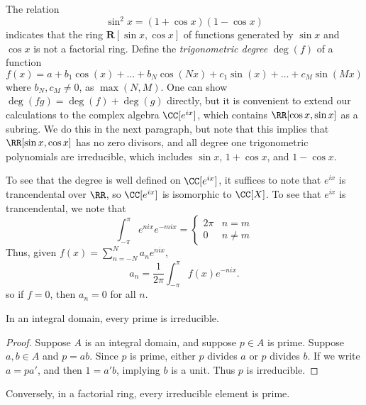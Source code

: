 \begin{example}
    The relation
    \[ \sin^2 x = (1 + \cos x)(1 - \cos x) \]
    indicates that the ring $\mathbf{R}[\sin x, \cos x]$ of functions generated by $\sin x$ and $\cos x$ is not a factorial ring. Define the \emph{trigonometric degree} $\deg(f)$ of a function
    \[ f(x) = a + b_1 \cos(x) + \dots + b_N \cos(Nx) + c_1 \sin(x) + \dots + c_M \sin(Mx) \]
    where $b_N, c_M \neq 0$, as $\max(N,M)$. One can show $\deg(fg) = \deg(f) + \deg(g)$ directly, but it is convenient to extend our calculations to the complex algebra $\CC[e^{ix}]$, which contains $\RR[\cos x, \sin x]$ as a subring. We do this in the next paragraph, but note that this implies that $\RR[\sin x, \cos x]$ has no zero divisors, and all degree one trigonometric polynomials are irreducible, which includes $\sin x$, $1 + \cos x$, and $1 - \cos x$.

    To see that the degree is well defined on $\CC[e^{ix}]$, it suffices to note that $e^{ix}$ is trancendental over $\RR$, so $\CC[e^{ix}]$ is isomorphic to $\CC[X]$. To see that $e^{ix}$ is trancendental, we note that
    \[ \int_{-\pi}^\pi e^{nix} e^{-mix} = \begin{cases} 2\pi & n = m \\ 0 & n \neq m \end{cases} \]
    Thus, given $f(x) = \sum_{n = -N}^N a_n e^{nix}$,
    \[ a_n = \frac{1}{2\pi} \int_{-\pi}^\pi f(x) e^{-nix}. \]
    so if $f = 0$, then $a_n = 0$ for all $n$.
\end{example}

\begin{lemma}
    In an integral domain, every prime is irreducible.
\end{lemma}
\begin{proof}
    Suppose $A$ is an integral domain, and suppose $p \in A$ is prime. Suppose $a,b \in A$ and $p = ab$. Since $p$ is prime, either $p$ divides $a$ or $p$ divides $b$. If we write $a = pa'$, and then $1 = a'b$, implying $b$ is a unit. Thus $p$ is irreducible.
\end{proof}

Conversely, in a factorial ring, every irreducible element is prime.


